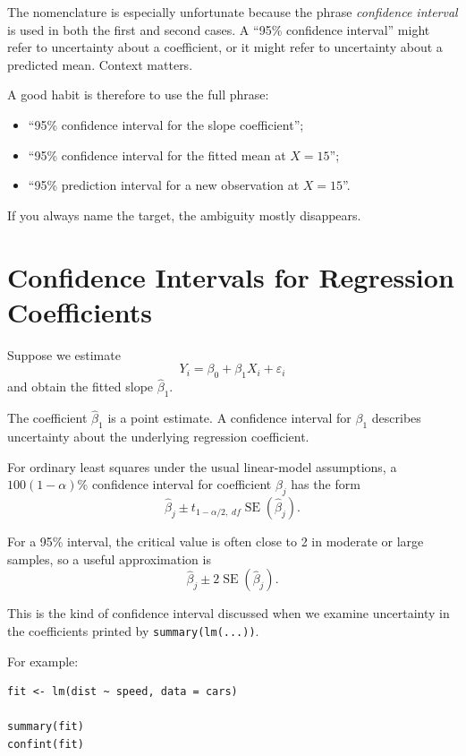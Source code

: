 \documentclass[11pt]{report}
\begin{document}
The nomenclature is especially unfortunate because the phrase \emph{confidence interval} is used in both the first and second cases. A ``95\% confidence interval'' might refer to uncertainty about a coefficient, or it might refer to uncertainty about a predicted mean. Context matters.

A good habit is therefore to use the full phrase:

\begin{itemize}
    \item ``95\% confidence interval for the slope coefficient'';
    \item ``95\% confidence interval for the fitted mean at \(X=15\)'';
    \item ``95\% prediction interval for a new observation at \(X=15\)''.
\end{itemize}

If you always name the target, the ambiguity mostly disappears.

\section{Confidence Intervals for Regression Coefficients}

Suppose we estimate
\[
Y_i=\beta_0+\beta_1X_i+\varepsilon_i
\]
and obtain the fitted slope \(\widehat{\beta}_1\).

The coefficient \(\widehat{\beta}_1\) is a point estimate. A confidence interval for \(\beta_1\) describes uncertainty about the underlying regression coefficient.

For ordinary least squares under the usual linear-model assumptions, a \(100(1-\alpha)\%\) confidence interval for coefficient \(\beta_j\) has the form
\[
\widehat{\beta}_j
\pm
t_{1-\alpha/2,\;df}
\operatorname{SE}(\widehat{\beta}_j).
\]

For a 95\% interval, the critical value is often close to 2 in moderate or large samples, so a useful approximation is
\[
\widehat{\beta}_j
\pm
2\operatorname{SE}(\widehat{\beta}_j).
\]

This is the kind of confidence interval discussed when we examine uncertainty in the coefficients printed by \texttt{summary(lm(...))}.

For example:

\begin{lstlisting}
fit <- lm(dist ~ speed, data = cars)

summary(fit)
confint(fit)
\end{lstlisting}
\end{document}

